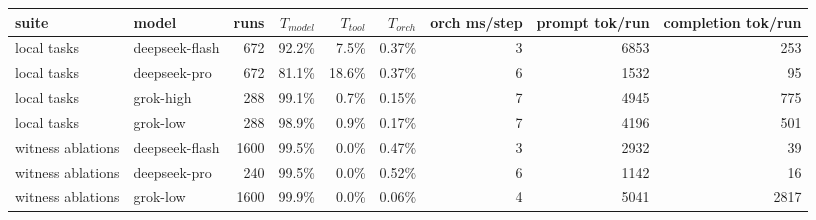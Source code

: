 \begin{tabular}{llrrrrrrr}
\toprule
suite & model & runs & $T_{model}$ & $T_{tool}$ & $T_{orch}$ & orch ms/step & prompt tok/run & completion tok/run \\
\midrule
local tasks & deepseek-flash & 672 & 92.2\% & 7.5\% & 0.37\% & 3 & 6853 & 253 \\
local tasks & deepseek-pro & 672 & 81.1\% & 18.6\% & 0.37\% & 6 & 1532 & 95 \\
local tasks & grok-high & 288 & 99.1\% & 0.7\% & 0.15\% & 7 & 4945 & 775 \\
local tasks & grok-low & 288 & 98.9\% & 0.9\% & 0.17\% & 7 & 4196 & 501 \\
witness ablations & deepseek-flash & 1600 & 99.5\% & 0.0\% & 0.47\% & 3 & 2932 & 39 \\
witness ablations & deepseek-pro & 240 & 99.5\% & 0.0\% & 0.52\% & 6 & 1142 & 16 \\
witness ablations & grok-low & 1600 & 99.9\% & 0.0\% & 0.06\% & 4 & 5041 & 2817 \\
\bottomrule
\end{tabular}
